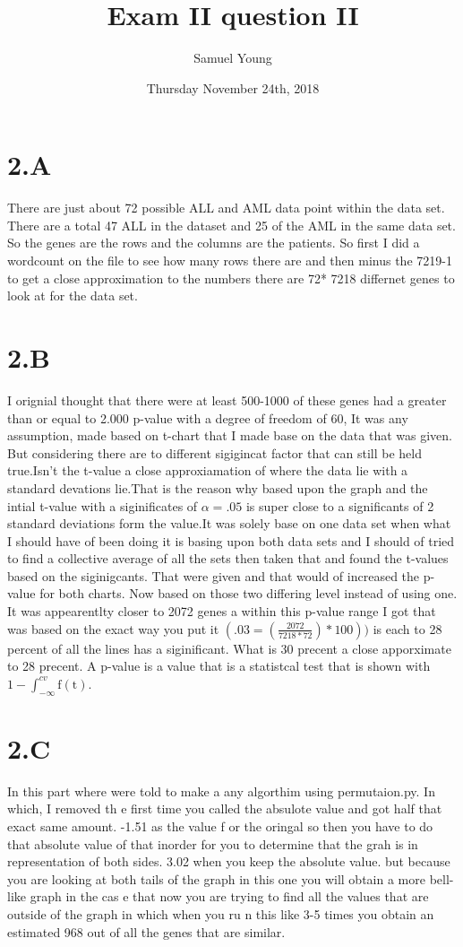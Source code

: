 \documentclass[12pt]{article}
\author{Samuel Young}
\title{Exam II question II}
\date{Thursday November 24th, 2018}
\begin{document}
\maketitle

\part{2.A}
   There are just about 72 possible ALL and AML data point within the data set. There are a total 47 ALL in the dataset and 25 of the AML in the same data set. So the genes are the rows and the columns are the patients. So first I did a wordcount on the file to see how many rows there are and then minus the 7219-1 to get a close approximation to the numbers there are 72* 7218 differnet genes to look at for the data set.
 
  \part{2.B}
                  I orignial thought that there were at least 500-1000 of these genes had a greater than or equal to 2.000 p-value with a degree of freedom of 60, It was any assumption, made based on t-chart that I made base on the data that was given. But considering there are to different sigigincat factor that can still be held true.Isn't the t-value a close approxiamation of where the data lie with a standard devations lie.That is the reason why based upon the graph and the intial t-value with a siginificates of $\alpha=.05$ is super close to a significants of 2 standard deviations form the value.It was solely base on one data set when what I should have of been doing it is basing upon both data sets and I should of tried to find a collective average of all the sets then taken that and found the t-values based on the siginigcants. That were given and that would of increased the p-value for both charts. Now based on those two differing level instead of using one. It was  appearentlty closer to 2072 genes a within this p-value range I got that was based on  the exact way you put it $(.03=(\frac{2072}{7218*72})*100))$ is each to 28 percent of all the lines has a siginificant. What is 30 precent a close apporximate to 28 precent. A p-value is a value that is a statistcal test that is shown with $1 - \int_{-\infty}^{cv} \mathrm{f(t)}$.
\part{2.C}
      In this part where were told to make a any algorthim using permutaion.py. In which, I removed th    e first time you called the absulote value and got half that exact same amount. -1.51 as the value f    or the oringal so then you have to do that absolute value of that inorder for you to determine that     the grah is in representation of both sides. 3.02 when you keep the absolute value. but because you     are looking at both tails of the graph in this one you will obtain a more bell-like graph in the cas    e that now you are trying to find all the values that are outside of the graph in which when  you ru    n this like 3-5 times you obtain an estimated 968 out of all the genes that are similar.
\end{document}
